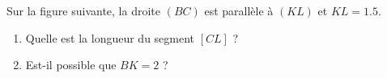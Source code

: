 
\begin{exercice}\label{exo2smath-0090}

    Sur la figure suivante, la droite \( (BC)\) est parallèle à \( (KL)\) et \( KL=1.5\).
\begin{center}
   
\end{center}

\begin{enumerate}
    \item
        Quelle est la longueur du segment \( [CL]\) ?
    \item
        Est-il possible que \( BK=2\) ?
\end{enumerate}

\end{exercice}
